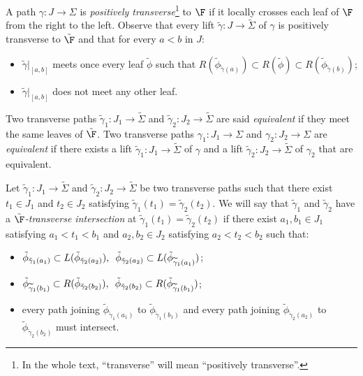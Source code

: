 A path $\gamma:J\to\Sigma$ is \emph {positively transverse}\footnote{In the whole text, ``transverse'' will mean ``positively transverse''.} to $\F$ if it locally crosses each leaf of $\F$ from the right to the left. Observe that every lift $\tilde\gamma:J\to\tilde\Sigma$ of $\gamma$ is positively transverse to $\tilde{\F}$ and that for every $a<b$ in $J$:
\begin{itemize}
\item $\tilde\gamma|_{[a,b]}$ meets once every leaf $\tilde\phi$ such that $R(\tilde\phi_{\tilde \gamma(a)})\subset R(\tilde\phi)\subset R(\tilde\phi_{\tilde \gamma(b)})$;
\item $\tilde\gamma|_{[a,b]}$ does not meet any other leaf.
\end{itemize}
Two transverse paths $\tilde\gamma_1:J_1\to\tilde\Sigma$ and $\tilde\gamma_2:J_2\to\tilde\Sigma$ are said \emph{equivalent} if they meet the same leaves of $\tilde{\F}$. Two transverse paths $\gamma_1:J_1\to\Sigma$ and $\gamma_2:J_2\to\Sigma$ are \emph{equivalent} if there exists a lift $\tilde\gamma_1:J_1\to\tilde\Sigma$ of $\gamma$ and a lift $\tilde\gamma_2:J_2\to\tilde\Sigma$ of $\gamma_2$ that are equivalent.

Let $\tilde\gamma_1:J_1\to \tilde\Sigma$ and $\tilde\gamma_2:J_2\to \tilde \Sigma$ be two transverse paths such that there exist $t_1\in J_1$ and $t_2\in J_2$ satisfying $\tilde\gamma_1(t_1)=\tilde\gamma_2(t_2)$. We will say that $\tilde\gamma_1$ and $\tilde\gamma_2$ have a \emph{$\tilde{\F}$-transverse intersection} at $\tilde\gamma_1(t_1)=\tilde\gamma_2(t_2)$ if there exist $a_1, b_1\in J_1$ satisfying $a_1<t_1<b_1$ and $a_2, b_2\in J_2$ satisfying $a_2<t_2<b_2$ such that:
\begin{itemize}
\item $\tilde\phi_{\tilde\gamma_1(a_1)}\subset L(\tilde\phi_{\tilde\gamma_2(a_2)}),\enskip \tilde\phi_{\tilde\gamma_2(a_2)}\subset L(\tilde\phi_{\widetilde\gamma_1(a_1)})$;

\item $\tilde\phi_{\widetilde\gamma_1(b_1)}\subset R(\tilde\phi_{\tilde\gamma_2(b_2)}),\enskip \tilde\phi_{\tilde\gamma_2(b_2)}\subset R(\tilde\phi_{\widetilde\gamma_1(b_1)})$;

\item every path joining $\tilde\phi_{\tilde\gamma_1(a_1)}$ to $\tilde\phi_{\tilde\gamma_1(b_1)}$ and every path joining $\tilde\phi_{\tilde\gamma_2(a_2)}$ to $\tilde\phi_{\tilde\gamma_2(b_2)}$ must intersect.
\end{itemize}

